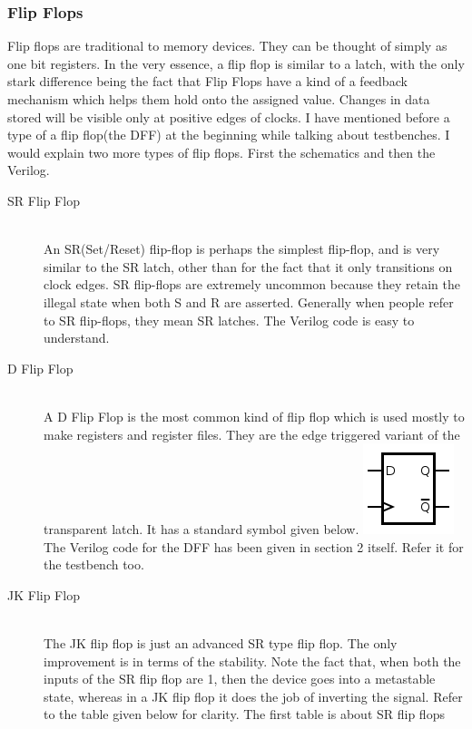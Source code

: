 \documentclass[11pt]{article}
\begin{document}
\subsubsection{Flip Flops}
Flip flops are traditional to memory devices. They can be thought of simply as one bit registers. In the very essence, a flip flop is similar to a latch, with the only stark difference being the fact that Flip Flops have a kind of a feedback mechanism which helps them hold onto the assigned value. Changes in data stored will be visible only at positive edges of clocks. I have mentioned before a type of a flip flop(the DFF) at the beginning while talking about testbenches. I would explain two more types of flip flops. First the schematics and then the Verilog.
\begin{description}
	\item[SR Flip Flop] \hfill \\
	An SR(Set/Reset) flip-flop is perhaps the simplest flip-flop, and is very similar to the SR latch, other than for the fact that it only transitions on clock edges.	SR flip-flops are extremely uncommon because they retain the illegal state when both S and R are asserted. Generally when people refer to SR flip-flops, they mean SR latches. The Verilog code is easy to understand.
	
	\item[D Flip Flop] \hfill \\
	A D Flip Flop is the most common kind of flip flop which is used mostly to make registers and register files. They are the edge triggered variant of the transparent latch. It has a standard symbol given below.
	\includegraphics[scale=1]{dff.png}
	The Verilog code for the DFF has been given in section 2 itself. Refer it for the testbench too. 
	\item[JK Flip Flop] \hfill \\
	The JK flip flop is just an advanced SR type flip flop. The only improvement is in terms of the stability. Note the fact that, when both the inputs of the SR flip flop are 1, then the device goes into a metastable state, whereas in a JK flip flop it does the job of inverting the signal. Refer to the table given below for clarity. The first table is about SR flip flops
\begin{center}

\end{center}
\end{description}
\end{document}
